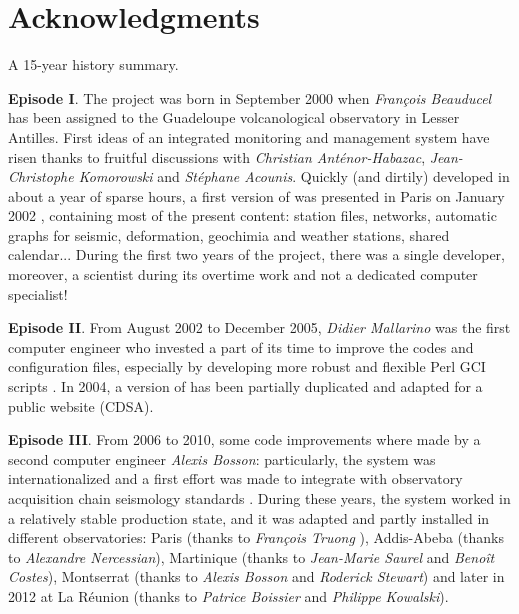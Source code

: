 
\chapter{Acknowledgments}


A 15-year history summary.

\textbf{Episode I}. The \webobs project was born in September 2000 when \textit{François Beauducel} has been assigned to the Guadeloupe volcanological observatory in Lesser Antilles. First ideas of an integrated monitoring and management system have risen thanks to fruitful discussions with \textit{Christian Anténor-Habazac}, \textit{Jean-Christophe Komorowski} and \textit{Stéphane Acounis}. Quickly (and dirtily) developed in about a year of sparse hours, a first version of \webobs was presented in Paris on January 2002 \citep{beauducel2002qes}, containing most of the present content: station files, networks, automatic graphs for seismic, deformation, geochimia and weather stations, shared calendar... During the first two years of the project, there was a single developer, moreover, a scientist during its overtime work and not a dedicated computer specialist!

\textbf{Episode II}. From August 2002 to December 2005, \textit{Didier Mallarino} was the first computer engineer who invested a part of its time to improve the codes and configuration files, especially by developing more robust and flexible Perl GCI scripts \citep{beauducel2004webovs,beauducel2005wim,beauducel2006sov}. In 2004, a version of \webobs has been partially duplicated and adapted for a public website (CDSA).

\textbf{Episode III}. From 2006 to 2010, some code improvements where made by a second computer engineer \textit{Alexis Bosson}: particularly, the system was internationalized and a first effort was made to integrate \webobs with observatory acquisition chain seismology standards \citep{beauducel2010webobs}. During these years, the system worked in a relatively stable production state, and it was adapted and partly installed in different observatories: Paris (thanks to \textit{François Truong} \citep{truong2009magis}), Addis-Abeba (thanks to \textit{Alexandre Nercessian}), Martinique (thanks to \textit{Jean-Marie Saurel} and \textit{Benoît Costes}), Montserrat (thanks to \textit{Alexis Bosson} and \textit{Roderick Stewart}) and later in 2012 at La Réunion (thanks to \textit{Patrice Boissier} and \textit{Philippe Kowalski}).

